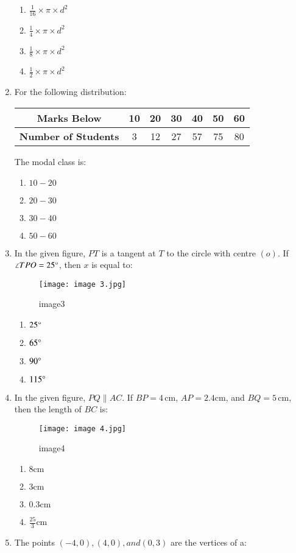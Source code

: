 \documentclass[12pt,-letter paper]{article}
\providecommand{\brak}[1]{\ensuremath{\left(#1\right)}}
\begin{document}
\begin{enumerate}
\begin{enumerate}
    \item $\frac{1}{16} \times \pi \times d^2$
    \item $\frac{1}{4} \times \pi \times d^2$
    \item $\frac{1}{8} \times \pi \times d^2$
    \item $\frac{1}{2} \times \pi \times d^2$
\end{enumerate}
\item For the following distribution:

\begin{center}
\begin{tabular}{|c|c|c|c|c|c|c|}
\hline
\textbf{Marks Below} & 10 & 20 & 30 & 40 & 50 & 60 \\
\hline
\textbf{Number of Students} & 3 & 12 & 27 & 57 & 75 & 80 \\
\hline
\end{tabular}
\end{center}

The modal class is:

\begin{enumerate}
    \item $10-20$
    \item $20-30$
    \item $30-40$
    \item $50-60$
\end{enumerate}
\newpage
\item In the given figure, $PT$ is a tangent at $T$ to the circle with centre $\brak{o}$. If $\angle TPO = 25\degree$, then $x$ is equal to:
\begin{figure}[!ht]
\centering
\texttt{[image: image 3.jpg]}
\label{fig:image1}
        \caption{image3}
\end{figure}
\begin{enumerate}
    \item $25\degree$
    \item $65\degree$
    \item $90\degree$
    \item $115\degree$
\end{enumerate}
\newpage
\item In the given figure, $PQ \parallel AC$. If $BP = 4 \, \mathrm{cm}$, $AP = 2.4 \mathrm{cm}$, and $BQ = 5 \, \mathrm{cm}$, then the length of $BC$ is:
\begin{figure}[!ht]
\centering
\texttt{[image: image 4.jpg]}
\label{fig:image1}                                                  \caption{image4}                                    
\end{figure}
	\begin{enumerate}
    \item $8\mathrm{cm}$
    \item $3\mathrm{cm}$
    \item $0.3 \mathrm{cm}$
    \item $\frac{25}{3}\mathrm{cm}$
\end{enumerate}
\item The points $\brak{-4,0},\brak {4,0}, and \brak{0,3}$ are the vertices of a:


\end{enumerate}
\end{document}
